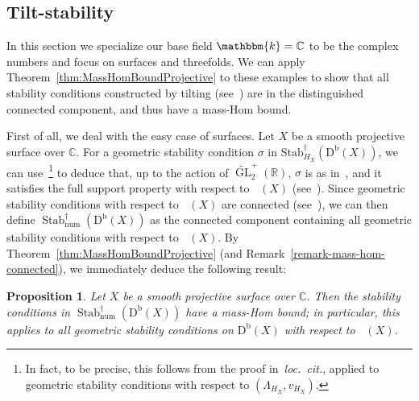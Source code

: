 \documentclass[11pt, reqno]{amsart}
\numberwithin{equation}{section}
\theoremstyle{plain}
\newtheorem{proposition}[theorem]{Proposition}
\theoremstyle{remark}
\theoremstyle{definition}
\theoremstyle{italicsname}
\newcommand{\Db}{\mathrm{D^b}}
\newcommand{\num}{\mathrm{num}}
\DeclareMathOperator{\Knum}{\rK_{\num}}
\DeclareMathOperator{\Stab}{Stab}
\newcommand{\Stabdagger}{\mathrm{Stab}^\dagger}
\DeclareMathOperator{\GL}{GL}
\newcommand{\rK}{\mathrm{K}}
\newcommand{\KK}{\mathbbm{k}}
\def\CC{\ensuremath{\mathbb{C}}}
\def\RR{\ensuremath{\mathbb{R}}}
\begin{document}
\subsection{Tilt-stability}
\label{subsec:Threefolds}

In this section we specialize our base field $\KK=\CC$ to be the complex numbers and focus on surfaces and threefolds. 
We can apply Theorem~\ref{thm:MassHomBoundProjective} to these examples to show that all stability conditions constructed by tilting (see~\cite{BMT:BG,BMS:StabCY3s}) are in the distinguished connected component, and thus have a mass-Hom bound.

First of all, we deal with the easy case of surfaces.
Let $X$ be a smooth projective surface over $\CC$.
For a geometric stability condition $\sigma$ in $\Stabdagger_{H_X}(\Db(X))$, we can use~\cite[Theorem 5.10]{hannah:stabonabquot}\footnote{In fact, to be precise, this follows from the proof in~\emph{loc.~cit.}, applied to geometric stability conditions with respect to $(\Lambda_{H_X},v_{H_X})$.} to deduce that, up to the action of $\widetilde{\GL}_2^+(\RR)$, $\sigma$ is as in~\cite[Proposition 5.15]{hannah:stabonabquot}, and it satisfies the full support property with respect to $\Knum(X)$ (see~\cite[Proposition 5.35]{hannah:stabonabquot}).
Since geometric stability conditions with respect to $\Knum(X)$ are connected (see~\cite[Theorem 5.36]{hannah:stabonabquot}), we can then define $\Stab^\dagger_{\mathrm{num}}(\Db(X))$ as the connected component containing all geometric stability conditions with respect to $\Knum(X)$.
By Theorem~\ref{thm:MassHomBoundProjective} (and Remark~\ref{remark-mass-hom-connected}), we immediately deduce the following result:

\begin{proposition}\label{prop:MassHomBoundSurfaces}
Let $X$ be a smooth projective surface over $\CC$.
Then the stability conditions in $\Stab^\dagger_{\mathrm{num}}(\Db(X))$ have a mass-Hom bound; in particular, this applies to all geometric stability conditions on $\Db(X)$ with respect to $\Knum(X)$.
\end{proposition}
\end{document}
